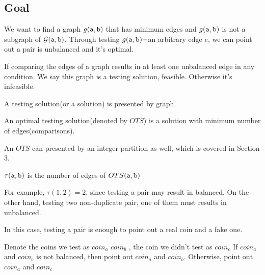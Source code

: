 \subsection*{Goal}
We want to find a graph $g(\mathtt{a},\mathtt{b})$ that has minimum edges and $g(\mathtt{a},\mathtt{b})$ is not a subgraph of ${\cal G}(\mathtt{a},\mathtt{b})$. Through testing $g(\mathtt{a},\mathtt{b})-$an arbitrary edge $e$, we can point out a pair is unbalanced and it's optimal.

If comparing the edges of a graph results in at least one unbalanced edge in any condition.
We say this graph is a testing solution, feasible. Otherwise it's infeasible.

A testing solution(or a solution) is presented by graph.

\begin{definition}
An optimal testing solution(denoted by $OTS$) is a solution with minimum number of edges(comparisons).
\end{definition}

An $OTS$ can presented by an integer partition as well, which is covered in Section 3.

\begin{definition}
$\tau(\mathtt{a},\mathtt{b})$ is the number of edges of $OTS(\mathtt{a},\mathtt{b})$
\end{definition}

For example, $\tau(1,2)=2$, since testing a pair may result in balanced. On the other hand, testing two non-duplicate pair, one of them must results in unbalanced.

In this case, testing a pair is enough to point out a real coin and a fake one. 

Denote the coins we test as $coin_a$ $coin_b$ , the coin we didn't test as $coin_c$
If $coin_a$ and $coin_b$ is not balanced, then point out $coin_a$ and $coin_b$. Otherwise, point out $coin_a$ and $coin_c$